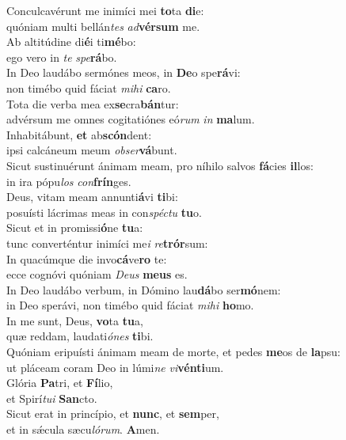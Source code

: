 \evenverse Conculcavérunt me inimíci mei \textbf{to}ta \textbf{di}e:~\*\\
\evenverse quóniam multi bellán\textit{tes} \textit{ad}\textbf{vér}\textbf{sum} me.\\
\oddverse Ab altitúdine di\textbf{é}i ti\textbf{mé}bo:~\*\\
\oddverse ego vero in \textit{te} \textit{spe}\textbf{rá}bo.\\
\evenverse In Deo laudábo sermónes meos, in \textbf{De}o spe\textbf{rá}vi:~\*\\
\evenverse non timébo quid fáciat \textit{mi}\textit{hi} \textbf{ca}ro.\\
\oddverse Tota die verba mea ex\textbf{se}cra\textbf{bán}tur:~\*\\
\oddverse advérsum me omnes cogitatiónes eó\textit{rum} \textit{in} \textbf{ma}lum.\\
\evenverse Inhabitábunt, \textbf{et} ab\textbf{scón}dent:~\*\\
\evenverse ipsi calcáneum meum \textit{ob}\textit{ser}\textbf{vá}bunt.\\
\oddverse Sicut sustinuérunt ánimam meam, pro níhilo salvos \textbf{fá}cies \textbf{il}los:~\*\\
\oddverse in ira pópu\textit{los} \textit{con}\textbf{frín}ges.\\
\evenverse Deus, vitam meam annunti\textbf{á}vi \textbf{ti}bi:~\*\\
\evenverse posuísti lácrimas meas in con\textit{spé}\textit{ctu} \textbf{tu}o.\\
\oddverse Sicut et in promissi\textbf{ó}ne \textbf{tu}a:~\*\\
\oddverse tunc converténtur inimíci me\textit{i} \textit{re}\textbf{trór}sum:\\
\evenverse In quacúmque die invo\textbf{cá}ve\textbf{ro} te:~\*\\
\evenverse ecce cognóvi quóniam \textit{De}\textit{us} \textbf{me}\textbf{us} es.\\
\oddverse In Deo laudábo verbum, in Dómino lau\textbf{dá}bo ser\textbf{mó}nem:~\*\\
\oddverse in Deo sperávi, non timébo quid fáciat \textit{mi}\textit{hi} \textbf{ho}mo.\\
\evenverse In me sunt, Deus, \textbf{vo}ta \textbf{tu}a,~\*\\
\evenverse quæ reddam, laudati\textit{ó}\textit{nes} \textbf{ti}bi.\\
\oddverse Quóniam eripuísti ánimam meam de morte, et pedes \textbf{me}os de \textbf{la}psu:~\*\\
\oddverse ut pláceam coram Deo in lúmi\textit{ne} \textit{vi}\textbf{vén}\textbf{ti}um.\\
\evenverse Glória \textbf{Pa}tri, et \textbf{Fí}lio,~\*\\
\evenverse et Spirí\textit{tu}\textit{i} \textbf{San}cto.\\
\oddverse Sicut erat in princípio, et \textbf{nunc}, et \textbf{sem}per,~\*\\
\oddverse et in sǽcula sæcu\textit{ló}\textit{rum}. \textbf{A}men.\\
